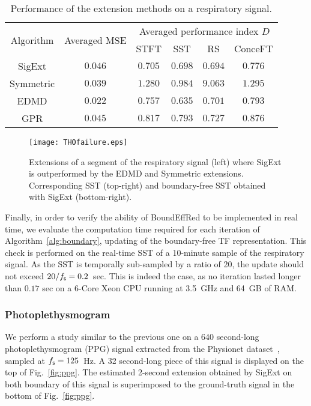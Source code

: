 \begin{table}
\centering
\caption{Performance of the extension methods on a respiratory signal.}
\begin{tabular}{|c||c||c|c|c|c|}
  \hline
   \multirow{2}{*}{Algorithm} & \multirow{2}{35pt}{\centering Averaged MSE} & \multicolumn{4}{c|}{Averaged performance index $D$} \\
   \cline{3-6}
      & & STFT & SST & RS & ConceFT \\
   \hhline{|=#=#=|=|=|=|}
   {\sf SigExt} & $0.046$ & $0.705$ & $0.698$ & $0.694$ & $0.776$ \\
   \hline
   Symmetric & $0.039$ & $1.280$ & $0.984$ & $9.063$ & $1.295$ \\
   \hline
   EDMD & $0.022$ & $0.757$ & $0.635$ & $0.701$ & $0.793$ \\
   \hline
   GPR & $0.045$ & $0.817$ & $0.793$ & $0.727$ & $0.876$ \\ 
   \hline
\end{tabular}
\label{tab:THO}
\end{table}

\begin{figure}
\centering
\texttt{[image: THOfailure.eps]}
\caption{Extensions of a segment of the respiratory signal (left) where {\sf SigExt} is outperformed by the EDMD and Symmetric extensions. Corresponding SST (top-right) and boundary-free SST obtained with {\sf SigExt} (bottom-right).}
\label{fig:THO.failure}
\end{figure} 

Finally, in order to verify the ability of {\sf BoundEffRed} to be implemented in real time, we evaluate the computation time required for each iteration of Algorithm~\ref{alg:boundary}, updating of the boundary-free TF representation. This check is performed on the real-time SST of a 10-minute sample of the respiratory signal. As the SST is temporally sub-sampled by a ratio of 20, the update should not exceed $20/f_{\mathsf s}=0.2$~sec. This is indeed the case, as no iteration lasted longer than $0.17$ sec on a 6-Core Xeon CPU running at 3.5~GHz and 64~GB of RAM.


\subsubsection{Photoplethysmogram}
\label{ssse:ppg}
We perform a study similar to the previous one on a 640 second-long photoplethysmogram (PPG) signal extracted from the Physionet dataset~\cite{Pimentel17toward, Goldberger00physiobank}, sampled at $f_{\mathsf s}=125$~Hz. A 32 second-long piece of this signal is displayed on the top of Fig.~\ref{fig:ppg}. The estimated 2-second extension obtained by {\sf SigExt} on both boundary of this signal is superimposed to the ground-truth signal in the bottom of Fig.~\ref{fig:ppg}.

